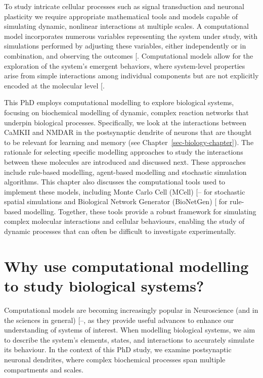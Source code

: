 \documentclass[
  11pt,
  letterpaper,
]{scrreprt}
\begin{document}
To study intricate cellular processes such as signal transduction and
neuronal plasticity we require appropriate mathematical tools and models
capable of simulating dynamic, nonlinear interactions at multiple
scales. A computational model incorporates numerous variables
representing the system under study, with simulations performed by
adjusting these variables, either independently or in combination, and
observing the outcomes {[}\citeproc{ref-hassan2023Perspectives}{239}{]}.
Computational models allow for the exploration of the system's emergent
behaviors, where system-level properties arise from simple interactions
among individual components but are not explicitly encoded at the
molecular level {[}\citeproc{ref-xiao2015Emergent}{240}{]}.

This PhD employs computational modelling to explore biological systems,
focusing on biochemical modelling of dynamic, complex reaction networks
that underpin biological processes. Specifically, we look at the
interactions between CaMKII and NMDAR in the postsynaptic dendrite of
neurons that are thought to be relevant for learning and memory (see
Chapter~\ref{sec-biology-chapter}). The rationale for selecting specific
modelling approaches to study the interactions between these molecules
are introduced and discussed next. These approaches include rule-based
modelling, agent-based modelling and stochastic simulation algorithms.
This chapter also discusses the computational tools used to implement
these models, including Monte Carlo Cell (MCell)
{[}--\citeproc{ref-husar2022MCell4}{244}{]}
for stochastic spatial simulations and Biological Network Generator
(BioNetGen) {[}\citeproc{ref-harris2016BioNetGena}{245}{]} for
rule-based modelling. Together, these tools provide a robust framework
for simulating complex molecular interactions and cellular behaviours,
enabling the study of dynamic processes that can often be difficult to
investigate experimentally.

\section{Why use computational modelling to study biological
systems?}\label{why-use-computational-modelling-to-study-biological-systems}

Computational models are becoming increasingly popular in Neuroscience
(and in the sciences in general)
{[}--\citeproc{ref-levenstein2023Role}{248}{]},
as they provide useful advances to enhance our understanding of systems
of interest. When modelling biological systems, we aim to describe the
system's elements, states, and interactions to accurately simulate its
behaviour. In the context of this PhD study, we examine postsynaptic
neuronal dendrites, where complex biochemical processes span multiple
compartments and scales.
\end{document}
